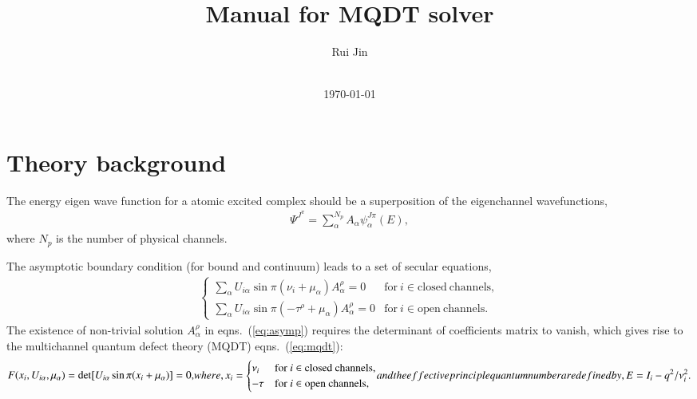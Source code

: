 \documentclass[11pt]{article}
\begin{document}
\title{Manual for MQDT solver}

\author{Rui Jin%
	\\
	\\
}

\normalem
\date{\today}
                     
\maketitle

\section{\label{sec:theory}Theory background}

The energy eigen wave function for a atomic excited complex should be a superposition of the eigenchannel wavefunctions, 
\begin{align}
\label{eq:wf-mix}
\Psi^{J^{\pi}}=\sum_{\alpha}^{N_p}A_\alpha\psi_\alpha^{J\pi}(E),
\end{align}
where $N_p$ is the number of physical channels. 

The asymptotic boundary condition (for bound and continuum) leads to a set of secular equations, 
\begin{align}
\label{eq:asymp}
\begin{cases}
{\displaystyle \sum_{\alpha}U_{i\alpha}\sin\pi(\nu_i+\mu_\alpha)A_\alpha^\rho=0} & \mathrm{for}\ i\in \mathrm{closed\ channels,}\\
{\displaystyle \sum_{\alpha}U_{i\alpha}\sin\pi(-\tau^\rho+\mu_\alpha)A_\alpha^\rho=0 } &  \mathrm{for}\ i\in \mathrm{open\ channels.}
\end{cases}
\end{align}
The existence of non-trivial solution $A_\alpha^\rho$ in eqns.~(\ref{eq:asymp}) requires the determinant of coefficients matrix to vanish, which gives rise to the multichannel quantum defect theory (MQDT) eqns.~(\ref{eq:mqdt}): 
\begin{subequations}
	\begin{align}
	\label{eq:mqdt}
	F({x_i},{U_{i\alpha},\mu_\alpha})=\det[U_{i\alpha}\sin\pi(x_i+\mu_\alpha)]=0,
	\end{align}
	where,
	\begin{align}
	x_i =
	\begin{cases}
	{\displaystyle \nu_i} & \mathrm{for}\ i\in \mathrm{closed\ channels,}\\
	{\displaystyle -\tau } &  \mathrm{for}\ i\in \mathrm{open\ channels,}
	\end{cases} \notag
	\end{align}
    and the effective principle quantum number are defined by,
	\begin{align}
	E=I_i-q^2/\nu^{2}_i.
	\end{align}
\end{subequations}
\end{document}
